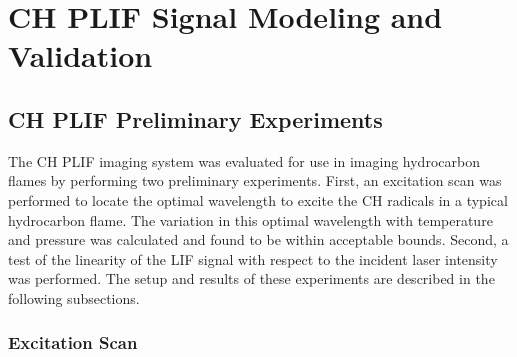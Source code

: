 \chapter{CH PLIF Signal Modeling and Validation}
\label{ch:chplif}






\section{CH PLIF Preliminary Experiments}
\label{sec:chplif-preliminary-experiments}

The CH PLIF imaging system was evaluated for use in imaging hydrocarbon flames by performing two preliminary experiments.
First, an excitation scan was performed to locate the optimal wavelength to excite the CH radicals in a typical hydrocarbon flame.
The variation in this optimal wavelength with temperature and pressure was calculated and found to be within acceptable bounds.
Second, a test of the linearity of the LIF signal with respect to the incident laser intensity was performed.
The setup and results of these experiments are described in the following subsections.

\subsection{Excitation Scan}
\label{subsec:prelim-excitation-scan}

